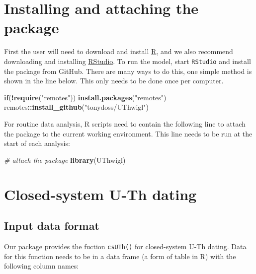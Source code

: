 \documentclass[]{elsarticle} %
\newenvironment{Shaded}{\begin{snugshade}}{\end{snugshade}}
\newcommand{\CommentTok}[1]{\textcolor[rgb]{0.56,0.35,0.01}{\textit{#1}}}
\newcommand{\ControlFlowTok}[1]{\textcolor[rgb]{0.13,0.29,0.53}{\textbf{#1}}}
\newcommand{\KeywordTok}[1]{\textcolor[rgb]{0.13,0.29,0.53}{\textbf{#1}}}
\newcommand{\NormalTok}[1]{#1}
\newcommand{\OperatorTok}[1]{\textcolor[rgb]{0.81,0.36,0.00}{\textbf{#1}}}
\newcommand{\StringTok}[1]{\textcolor[rgb]{0.31,0.60,0.02}{#1}}
\begin{document}
\hypertarget{installing-and-attaching-the-package}{%
\section{Installing and attaching the package}\label{installing-and-attaching-the-package}}

First the user will need to download and install \href{https://www.r-project.org/}{R}, and we also recommend downloading and installing \href{https://www.rstudio.com/}{RStudio}. To run the model, start \texttt{RStudio} and install the package from GitHub. There are many ways to do this, one simple method is shown in the line below. This only needs to be done once per computer.

\begin{Shaded}
\begin{Highlighting}[]
\ControlFlowTok{if}\NormalTok{(}\OperatorTok{!}\KeywordTok{require}\NormalTok{(}\StringTok{"remotes"}\NormalTok{)) }\KeywordTok{install.packages}\NormalTok{(}\StringTok{"remotes"}\NormalTok{)}
\NormalTok{remotes}\OperatorTok{::}\KeywordTok{install\_github}\NormalTok{(}\StringTok{"tonydoss/UThwigl"}\NormalTok{)}
\end{Highlighting}
\end{Shaded}

For routine data analysis, R scripts need to contain the following line to attach the package to the current working environment. This line needs to be run at the start of each analysis:

\begin{Shaded}
\begin{Highlighting}[]
\CommentTok{\# attach the package}
\KeywordTok{library}\NormalTok{(UThwigl)}
\end{Highlighting}
\end{Shaded}

\newpage

\hypertarget{closed-system-u-th-dating}{%
\section{Closed-system U-Th dating}\label{closed-system-u-th-dating}}

\hypertarget{input-data-format}{%
\subsection{Input data format}\label{input-data-format}}

Our package provides the fuction \texttt{csUTh()} for closed-system U-Th dating. Data for this function needs to be in a data frame (a form of table in R) with the following column names:
\end{document}
